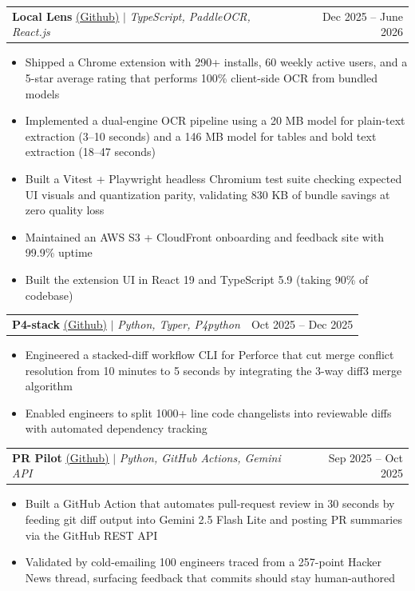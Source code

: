 \documentclass[letterpaper,11pt]{article}
\makeatletter
\newcommand{\resumeItem}[1]{
  \item\small{
    {#1 \vspace{-2pt}}
  }
}
\newcommand{\resumeProjectHeading}[2]{
    \item
    \begin{tabular*}{0.97\textwidth}{l@{\extracolsep{\fill}}r}
      \small#1 & #2 \\
    \end{tabular*}\vspace{-7pt}
}
\newcommand{\resumeItemListStart}{\begin{itemize}}
\newcommand{\resumeItemListEnd}{\end{itemize}\vspace{-5pt}}
\makeatother
\begin{document}
    \resumeProjectHeading
      {\textbf{Local Lens} \href{https://github.com/minhkhoango/local-lens}{\underline{(Github)}} $|$ \emph{TypeScript, PaddleOCR, React.js}}{Dec 2025 -- June 2026}
      \resumeItemListStart
        \resumeItem{Shipped a Chrome extension with 290+ installs, 60 weekly active users, and a 5-star average rating that performs 100\% client-side OCR from bundled models}
        \resumeItem{Implemented a dual-engine OCR pipeline using a 20 MB model for plain-text extraction (3--10 seconds) and a 146 MB model for tables and bold text extraction (18--47 seconds)}
        \resumeItem{Built a Vitest + Playwright headless Chromium test suite checking expected UI visuals and quantization parity, validating 830 KB of bundle savings at zero quality loss}
        \resumeItem{Maintained an AWS S3 + CloudFront onboarding and feedback site with 99.9\% uptime}
        \resumeItem{Built the extension UI in React 19 and TypeScript 5.9 (taking 90\% of codebase)}
      \resumeItemListEnd

    \resumeProjectHeading
      {\textbf{P4-stack} \href{https://github.com/minhkhoango/p4-stack}{\underline{(Github)}} $|$ \emph{Python, Typer, P4python}}{Oct 2025 -- Dec 2025}
      \resumeItemListStart
        \resumeItem{Engineered a stacked-diff workflow CLI for Perforce that cut merge conflict resolution from 10 minutes to 5 seconds by integrating the 3-way diff3 merge algorithm}
        \resumeItem{Enabled engineers to split 1000+ line code changelists into reviewable diffs with automated dependency tracking}
      \resumeItemListEnd

    \resumeProjectHeading
      {\textbf{PR Pilot} \href{https://github.com/minhkhoango/pr-pilot}{\underline{(Github)}} $|$ \emph{Python, GitHub Actions, Gemini API}}{Sep 2025 -- Oct 2025}
      \resumeItemListStart
        \resumeItem{Built a GitHub Action that automates pull-request review in 30 seconds by feeding git diff output into Gemini 2.5 Flash Lite and posting PR summaries via the GitHub REST API}
        \resumeItem{Validated by cold-emailing 100 engineers traced from a 257-point Hacker News thread, surfacing feedback that commits should stay human-authored}
      \resumeItemListEnd
\end{document}
